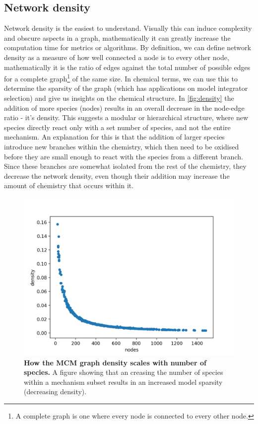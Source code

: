 \subsection{Network density}\label{sec:netdensity}
Network density is the easiest to understand. Visually this can induce complexity and obscure aspects in a graph, mathematically it can greatly increase the computation time for metrics or algorithms. By definition, we can define network density as a measure of how well connected a node is to every other node, mathematically it is the ratio of edges against the total number of possible edges for a complete graph\footnote{A complete graph is one where every node is connected to every other node.} of the same size. In chemical terms, we can use this to determine the sparsity of the graph (which has applications on model integrator selection) and give us insights on the chemical structure.  In \autoref{fig:density} the addition of more species (nodes) results in an overall decrease in the node-edge ratio - it's density. This suggests a modular or hierarchical structure, where new species directly react only with a set number of species, and not the entire mechanism. An explanation for this is that the addition of larger species introduce new branches within the chemistry, which then need to be oxidised before they are small enough to react with the species from a different branch.  Since these branches are somewhat isolated from the rest of the chemistry, they decrease the network density, even though their addition may increase the amount of chemistry that occurs within it.

\begin{figure}[H]
     \centering
         \includegraphics[width=.7\textwidth]{figures_c3/sparcity.png}
        \caption{\textbf{How the MCM graph density scales with number of species.} A figure showing that an creasing the number of species within a mechanism subset results in an increased model sparsity (decreasing density).}
        \label{fig:density}
\end{figure}

